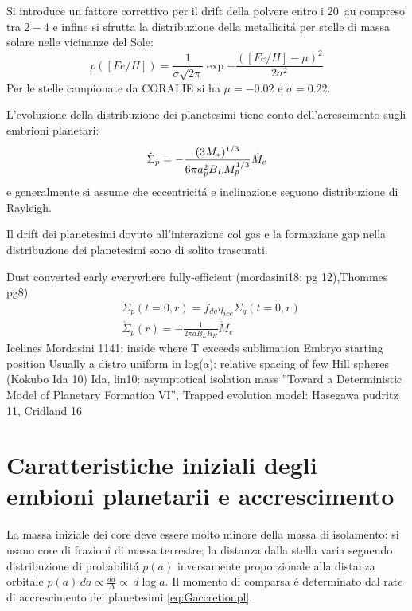 Si introduce un fattore correttivo per il drift della polvere entro i \SI{20}{\astronomicalunit} compreso tra $2-4$ e infine si sfrutta la distribuzione della metallicit\'a per stelle di massa solare nelle vicinanze del Sole:
\begin{equation}
p([Fe/H])=\frac{1}{\sigma\sqrt{2\pi}}\exp{-\frac{([Fe/H]-\mu)^2}{2\sigma^2}}
\end{equation}
Per le stelle campionate da CORALIE si ha $\mu=-0.02$ e $\sigma=0.22$.

L'evoluzione della distribuzione dei planetesimi tiene conto dell'acrescimento sugli embrioni planetari:
\begin{equation}\dot{\Sigma}_p=-\frac{(3M_*)^{1/3}}{6\pi a_p^2B_LM_p^{1/3}}\dot{M}_c\end{equation}
e generalmente si assume che eccentricit\'a e inclinazione seguono distribuzione di Rayleigh.

Il drift dei planetesimi dovuto all'interazione col gas e la formaziane gap nella distribuzione dei planetesimi sono di solito trascurati.

\begin{workout}
Dust converted early everywhere fully-efficient (mordasini18: pg 12),Thommes pg8)
\begin{align*}
&\Sigma_p(t=0,r)=f_{dg}\eta_{ice}\Sigma_g(t=0,r)\\
&\dot{\Sigma}_p(r)=-\frac{1}{2\pi aB_LR_H}\dot{M}_c
\end{align*}
Icelines Mordasini 1141: inside where T exceeds sublimation
{Embryo starting position}
Usually a distro uniform in log(a): relative spacing of few Hill spheres (Kokubo Ida 10)
Ida, lin10: asymptotical isolation mass ''Toward a Deterministic Model of Planetary Formation VI'',
Trapped evolution model: Hasegawa pudritz 11, Cridland 16
\end{workout}

\section{Caratteristiche iniziali degli embioni planetarii e accrescimento}

La massa iniziale dei core deve essere molto minore della massa di isolamento: si usano core di frazioni di massa terrestre; la distanza dalla stella varia seguendo distribuzione di probabilit\'a $p(a)$ inversamente proporzionale alla distanza orbitale $p(a)\,da\propto\frac{da}{\Delta}\propto\,d\log{a}$. Il momento di comparsa \'e determinato dal rate di accrescimento dei planetesimi \eqref{eq:Gaccretionpl}.

